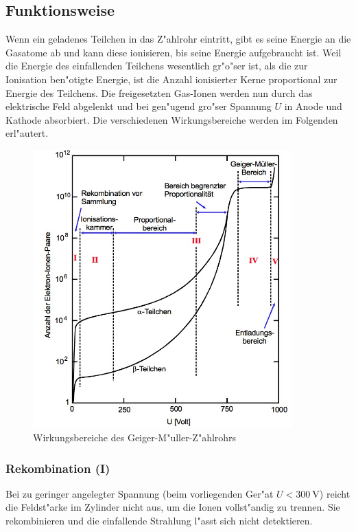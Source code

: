 	\subsection{Funktionsweise}
	\label{subsec:funktionsweise}
		Wenn ein geladenes Teilchen in das Z"ahlrohr eintritt, gibt es seine Energie an die Gas\-atome ab und kann diese ionisieren, bis seine Energie aufgebraucht ist.
		Weil die Energie des einfallenden Teilchens wesentlich gr"o"ser ist, als die zur Ionisation ben"otigte Energie, ist die Anzahl ionisierter Kerne proportional zur Energie des Teilchens.
		Die freigesetzten Gas-Ionen werden nun durch das elektrische Feld abgelenkt und bei gen"ugend gro"ser Spannung $U$ in Anode und Kathode absorbiert.
		Die verschiedenen Wirkungsbereiche werden im Folgenden erl"autert.

		\begin{figure}[h]
			\centering
			\includegraphics[width = 10cm]{img/bereiche.jpeg}
			\caption{Wirkungsbereiche des Geiger-M"uller-Z"ahlrohrs \cite{anleitung}}
			\label{fig:bereiche}
		\end{figure}

		\subsubsection{Rekombination (I)}
		\label{subsubsec:rekombination}
			Bei zu geringer angelegter Spannung (beim vorliegenden Ger"at $U < \SI{300}{\volt}$) reicht die Feldst"arke im Zylinder nicht aus, um die Ionen vollst"andig zu trennen.
			Sie rekombinieren und die einfallende Strahlung l"asst sich nicht detektieren.

